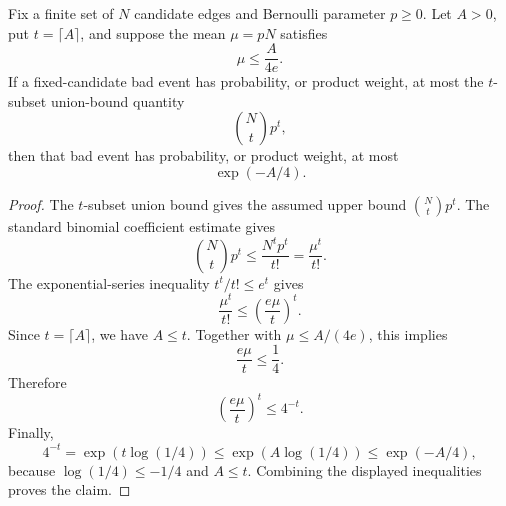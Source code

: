 \begin{lemma}
Fix a finite set of \(N\) candidate edges and Bernoulli parameter \(p\ge0\).
Let \(A>0\), put \(t=\lceil A\rceil\), and suppose the mean
\(\mu=pN\) satisfies
\[
\mu\le \frac{A}{4e}.
\]
If a fixed-candidate bad event has probability, or product weight, at most the
\(t\)-subset union-bound quantity
\[
\binom Nt p^t,
\]
then that bad event has probability, or product weight, at most
\[
\exp(-A/4).
\]
\end{lemma}
\begin{proof}
The \(t\)-subset union bound gives the assumed upper bound
\(\binom Nt p^t\).  The standard binomial coefficient estimate gives
\[
\binom Nt p^t\le \frac{N^t p^t}{t!}
  =\frac{\mu^t}{t!}.
\]
The exponential-series inequality \(t^t/t!\le e^t\) gives
\[
\frac{\mu^t}{t!}\le \left(\frac{e\mu}{t}\right)^t.
\]
Since \(t=\lceil A\rceil\), we have \(A\le t\).  Together with
\(\mu\le A/(4e)\), this implies
\[
\frac{e\mu}{t}\le\frac14.
\]
Therefore
\[
\left(\frac{e\mu}{t}\right)^t\le 4^{-t}.
\]
Finally,
\[
4^{-t}=\exp(t\log(1/4))
\le \exp(A\log(1/4))
\le \exp(-A/4),
\]
because \(\log(1/4)\le -1/4\) and \(A\le t\).  Combining the displayed
inequalities proves the claim.
\end{proof}
